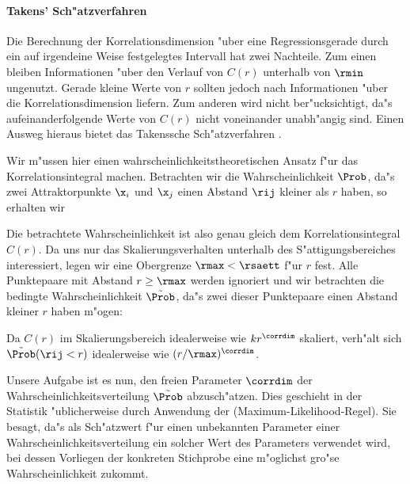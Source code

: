 \paragraph{Takens' Sch"atzverfahren}
\label{chaptakensest}
Die Berechnung der Korrelationsdimension "uber eine Regressionsgerade durch ein auf
irgendeine Weise festgelegtes Intervall hat zwei Nachteile. Zum einen bleiben
Informationen "uber den Verlauf von $C(r)$ unterhalb von $\rmin$ ungenutzt. Gerade kleine
Werte von $r$ sollten jedoch nach  Informationen "uber die
Korrelationsdimension liefern. Zum anderen wird nicht ber"ucksichtigt, da"s
aufeinanderfolgende Werte von $C(r)$ nicht voneinander unabh"angig sind. Einen Ausweg
hieraus bietet das Takenssche Sch"atzverfahren \cite{Takens85a}. 

Wir m"ussen hier einen wahrscheinlichkeitstheoretischen Ansatz f"ur das
Korrelationsintegral machen. Betrachten wir die Wahrscheinlichkeit $\Prob$, da"s zwei
Attraktorpunkte $\x_i$ und $\x_j$ einen Abstand $\rij$ kleiner als $r$ haben, so erhalten wir

Die betrachtete Wahrscheinlichkeit ist also genau gleich dem Korrelationsintegral $C(r)$.
Da uns nur das Skalierungsverhalten unterhalb des S"attigungsbereiches interessiert,
legen wir eine Obergrenze $\rmax<\rsaett$ f"ur $r$ fest. Alle Punktepaare mit Abstand
$r\geq\rmax$ werden ignoriert und wir betrachten die bedingte Wahrscheinlichkeit $\tilde
\Prob$, da"s zwei dieser Punktepaare einen Abstand kleiner $r$ haben m"ogen:

Da $C(r)$ im Skalierungsbereich idealerweise wie $kr^\corrdim$ skaliert, verh"alt sich
$\tilde \Prob(\rij<r)$ idealerweise wie $(r/\rmax)^\corrdim$. 

Unsere Aufgabe ist es nun, den freien Parameter $\corrdim$ der Wahrscheinlichkeitsverteilung
$\tilde\Prob$ abzusch"atzen.  Dies geschieht in der Statistik "ublicherweise durch
Anwendung der \begriff(Maximum-Likelihood-Regel).  Sie besagt, da"s als Sch"atzwert f"ur
einen unbekannten Parameter einer Wahrscheinlichkeitsverteilung ein solcher Wert des
Parameters verwendet wird, bei dessen Vorliegen der konkreten Stichprobe eine m"oglichst
gro"se Wahrscheinlichkeit zukommt.


